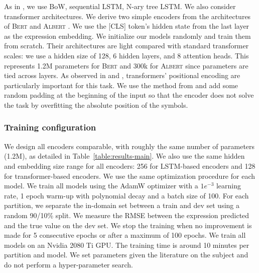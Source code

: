 As in , we use BoW, sequential LSTM, N-ary tree LSTM. We also consider transformer architectures. We derive two simple encoders from the architectures of \textsc{Bert} \parencite{devlin_19} and \textsc{Albert} \parencite{lan_20}. We use the \textsc{[CLS]} token’s hidden state  from the last layer as the expression embedding. We initialize our models randomly and train them from scratch. Their architectures are light compared with standard transformer scales: we use a hidden size of 128, 6 hidden layers, and 8 attention heads. This represents 1.2M parameters for \textsc{Bert} and 300k for \textsc{Albert} since parameters are tied across layers. As observed in \textcite{csordas_21} and \textcite{onta_21}, transformers' positional encoding are particularly important for this task. We use the method from \textcite{wallace_19} and add some random padding at the beginning of the input so that the encoder does not solve the task by overfitting the absolute position of the symbols.




\subsubsection{Training configuration}

We design all encoders comparable, with roughly the same number of parameters (1.2M), as detailed in Table~\ref{table:results-main}. We also use the same hidden and embedding size range for all encoders: 256 for LSTM-based encoders and 128 for transformer-based encoders. We use the same optimization procedure for each model.
We train all models using the AdamW optimizer \parencite{loshchilov_19} with a $1e^{-3}$ learning rate, 1 epoch warm-up with polynomial decay and a batch size of 100. For each partition, we separate the in-domain set between a train and dev set using a random 90/10\% split. We measure the RMSE between the expression predicted and the true value on the dev set. We stop the training when no improvement is made for 5 consecutive epochs or after a maximum of 100 epochs. We train all models on an Nvidia 2080 Ti GPU. The training time is around 10 minutes per partition and model. We set parameters given the literature on the subject and do not perform a hyper-parameter search.

